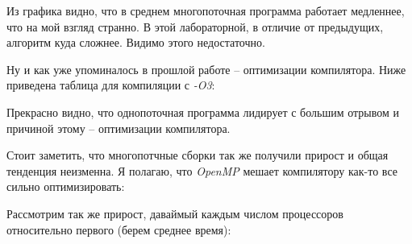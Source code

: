 \documentclass[a4paper, 12pt]{article}
\begin{document}
\vspace{0.5cm}

Из графика видно, что в среднем многопоточная программа работает медленнее, что на мой взгляд странно. В этой лабораторной, в отличие от предыдущих, алгоритм куда сложнее. Видимо этого недостаточно.

Ну и как уже упоминалось в прошлой работе -- оптимизации компилятора. Ниже приведена таблица для компиляции с \textit{-O3}:

\vspace{0.3cm}


\vspace{0.3cm}

Прекрасно видно, что однопоточная программа лидирует с большим отрывом и причиной этому -- оптимизации компилятора.

Стоит заметить, что многопотчные сборки так же получили прирост и общая тенденция неизменна. Я полагаю, что \textit{OpenMP} мешает компилятору как-то все сильно оптимизировать:

\vspace{0.3cm}


\vspace{0.3cm}

Рассмотрим так же прирост, даваймый каждым числом процессоров относительно первого (берем среднее время):
\end{document}

